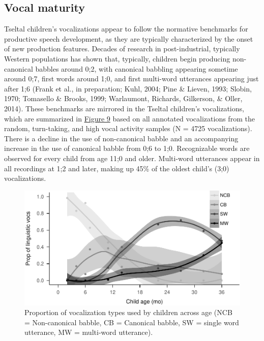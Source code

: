 \documentclass[floatsintext,man]{apa6}
\theoremstyle{definition}
\theoremstyle{definition}
\theoremstyle{definition}
\theoremstyle{remark}
\begin{document}
\subsection{Vocal maturity}\label{vocal-maturity}

Tseltal children's vocalizations appear to follow the normative
benchmarks for productive speech development, as they are typically
characterized by the onset of new production features. Decades of
research in post-industrial, typically Western populations has shown
that, typically, children begin producing non-canonical babbles around
0;2, with canonical babbling appearing sometime around 0;7, first words
around 1;0, and first multi-word utterances appearing just after 1;6
(Frank et al., in preparation; Kuhl, 2004; Pine \& Lieven, 1993; Slobin,
1970; Tomasello \& Brooks, 1999; Warlaumont, Richards, Gilkerson, \&
Oller, 2014). These benchmarks are mirrored in the Tseltal children's
vocalizations, which are summarized in \protect\hyperlink{fig9}{Figure
9} based on all annotated vocalizations from the random, turn-taking,
and high vocal activity samples (N = 4725 vocalizations). There is a
decline in the use of non-canonical babble and an accompanying increase
in the use of canonical babble from 0;6 to 1;0. Recognizable words are
observed for every child from age 11;0 and older. Multi-word utterances
appear in all recordings at 1;2 and later, making up 45\% of the oldest
child's (3;0) vocalizations.

\begin{figure}
\centering
\includegraphics{Tseltal-CLE_files/figure-latex/fig9-1.pdf}
\caption{\label{fig:fig9}Proportion of vocalization types used by children
across age (NCB = Non-canonical babble, CB = Canonical babble, SW =
single word utterance, MW = multi-word utterance).}
\end{figure}
\end{document}
